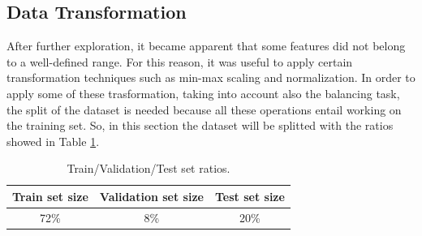 \documentclass[../main]{subfiles}
\begin{document}
\subsection*{Data Transformation}
After further exploration, it became apparent that some features did not belong to a well-defined range.
For this reason, it was useful to apply certain transformation techniques such as min-max scaling and normalization.
In order to apply some of these trasformation, taking into account also the balancing task, the split of the dataset is needed because all these operations entail working on the training set.
So, in this section the dataset will be splitted with the ratios showed in Table \ref{table:dataset_split}.
\begin{table}[h]
    \center
    \begin{tabular}{|c|c|c|}
        \hline
        \textbf{Train set size} & \textbf{Validation set size} & \textbf{Test set size} \\
        \hline
        72\%                    & 8\%                          & 20\%                   \\
        \hline
    \end{tabular}
    \caption{Train/Validation/Test set ratios.}
    \label{table:dataset_split}
\end{table}
\end{document}
